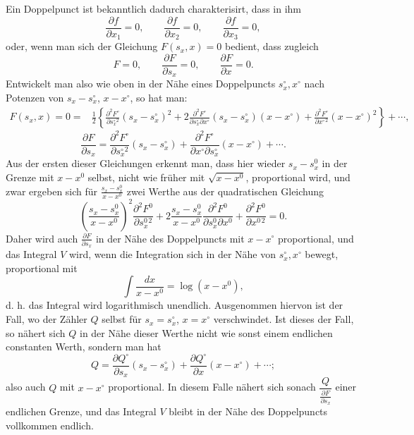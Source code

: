 \documentclass[10pt]{article}
\begin{document}
Ein Doppelpunct ist bekanntlich dadurch charakterisirt, dass in ihm
\[
\frac{\partial f}{\partial x_1}=0,\qquad \frac{\partial f}{\partial x_2}=0,\qquad \frac{\partial f}{\partial x_3}=0,
\]
oder, wenn man sich der Gleichung $F(s_x,x)=0$ bedient, dass zugleich
\[
F=0,\qquad \frac{\partial F}{\partial s_x}=0,\qquad \frac{\partial F}{\partial x}=0.
\]
Entwickelt man also wie oben in der Nähe eines Doppelpuncts $s_x^\circ,x^\circ$ nach Potenzen von $s_x-s_x^\circ$, $x-x^\circ$, so hat man:
\[
\begin{aligned}
F(s_x,x)=0={}&\frac12\left\{\frac{\partial^2F^\circ}{\partial s_x^{\circ\,2}}(s_x-s_x^\circ)^2
+2\frac{\partial^2F^\circ}{\partial s_x^\circ\partial x^\circ}(s_x-s_x^\circ)(x-x^\circ)
+\frac{\partial^2F^\circ}{\partial x^{\circ\,2}}(x-x^\circ)^2\right\}+\cdots,
\end{aligned}
\]
\[
\frac{\partial F}{\partial s_x}=\frac{\partial^2F^\circ}{\partial s_x^{\circ\,2}}(s_x-s_x^\circ)+\frac{\partial^2F^\circ}{\partial x^\circ\partial s_x^\circ}(x-x^\circ)+\cdots.
\]
Aus der ersten dieser Gleichungen erkennt man, dass hier wieder $s_x-s_x^0$ in der Grenze mit $x-x^0$ selbst, nicht wie früher mit $\sqrt{x-x^0}$, proportional wird, und zwar ergeben sich für $\frac{s_x-s_x^0}{x-x^0}$ zwei Werthe aus der quadratischen Gleichung
\[
\left(\frac{s_x-s_x^0}{x-x^0}\right)^2\frac{\partial^2F^0}{\partial s_x^{0\,2}}
+2\frac{s_x-s_x^0}{x-x^0}\frac{\partial^2F^0}{\partial s_x^0\partial x^0}
+\frac{\partial^2F^0}{\partial x^{0\,2}}=0.
\]
Daher wird auch $\frac{\partial F}{\partial s_x}$ in der Nähe des Doppelpuncts mit $x-x^\circ$ proportional, und das Integral $V$ wird, wenn die Integration sich in der Nähe von $s_x^\circ,x^\circ$ bewegt, proportional mit
\[
\int\frac{dx}{x-x^0}=\log(x-x^0),
\]
d. h. das Integral wird logarithmisch unendlich. Ausgenommen hiervon ist der Fall, wo der Zähler $Q$ selbst für $s_x=s_x^\circ$, $x=x^\circ$ verschwindet. Ist dieses der Fall, so nähert sich $Q$ in der Nähe dieser Werthe nicht wie sonst einem endlichen constanten Werth, sondern man hat
\[
Q=\frac{\partial Q^\circ}{\partial s_x}(s_x-s_x^\circ)+\frac{\partial Q^\circ}{\partial x}(x-x^\circ)+\cdots;
\]
also auch $Q$ mit $x-x^\circ$ proportional. In diesem Falle nähert sich sonach $\dfrac{Q}{\frac{\partial F}{\partial s_x}}$ einer endlichen Grenze, und das Integral $V$ bleibt in der Nähe des Doppelpuncts vollkommen endlich.
\end{document}

